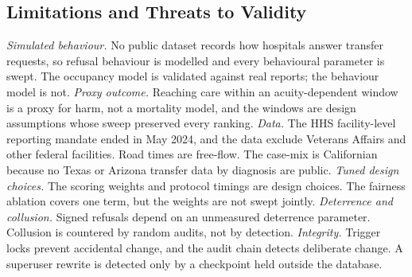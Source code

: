 \subsection{Limitations and Threats to Validity}
\emph{Simulated behaviour.} No public dataset records how hospitals answer transfer requests, so refusal behaviour is modelled and every behavioural parameter is swept. The occupancy model is validated against real reports; the behaviour model is not.
\emph{Proxy outcome.} Reaching care within an acuity-dependent window is a proxy for harm, not a mortality model, and the windows are design assumptions whose sweep preserved every ranking.
\emph{Data.} The HHS facility-level reporting mandate ended in May 2024, and the data exclude Veterans Affairs and other federal facilities. Road times are free-flow. The case-mix is Californian because no Texas or Arizona transfer data by diagnosis are public.
\emph{Tuned design choices.} The scoring weights and protocol timings are design choices. The fairness ablation covers one term, but the weights are not swept jointly.
\emph{Deterrence and collusion.} Signed refusals depend on an unmeasured deterrence parameter. Collusion is countered by random audits, not by detection.
\emph{Integrity.} Trigger locks prevent accidental change, and the audit chain detects deliberate change. A superuser rewrite is detected only by a checkpoint held outside the database.
